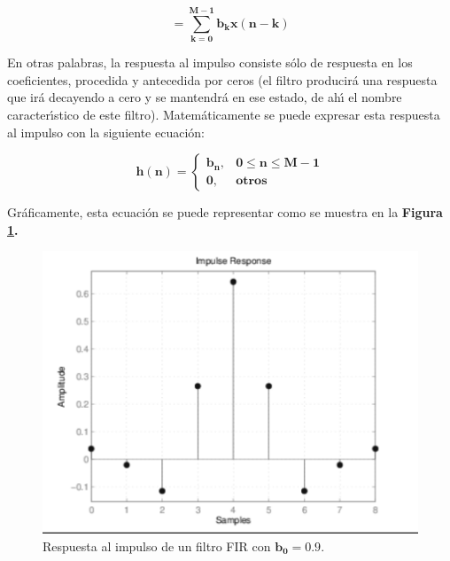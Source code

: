 \begin{equation}
=\mathbf{\sum_{k=0}^{M-1}b_{k}x(n-k)}
\end{equation}

En otras palabras, la respuesta al impulso consiste s\'{o}lo de respuesta
en los coeficientes, procedida y antecedida por ceros (el filtro producir\'{a}
una respuesta que ir\'{a} decayendo a cero y se mantendr\'{a} en ese
estado, de ah\'{\i} el nombre caracter\'{\i}stico de este filtro).
Matem\'{a}ticamente se puede expresar esta respuesta al impulso con
la siguiente ecuaci\'{o}n:

\begin{equation}
\mathbf{h(n)=\begin{cases}
b_{n}, & 0\leq n\leq M-1\\
0, & otros
\end{cases}}
\end{equation}

Gr\'{a}ficamente, esta ecuaci\'{o}n se puede representar como se muestra
en la \textbf{Figura \ref{fig:Respuesta-al-impulso}.}

\begin{figure}[H]
\begin{centering}
\includegraphics[scale=0.6]{img/fir_filter_impulseresponse_gray}\caption{Respuesta al impulso de un filtro FIR con $\mathbf{b_{0}=0.9}$. \label{fig:Respuesta-al-impulso}}
\par\end{centering}
\end{figure}

